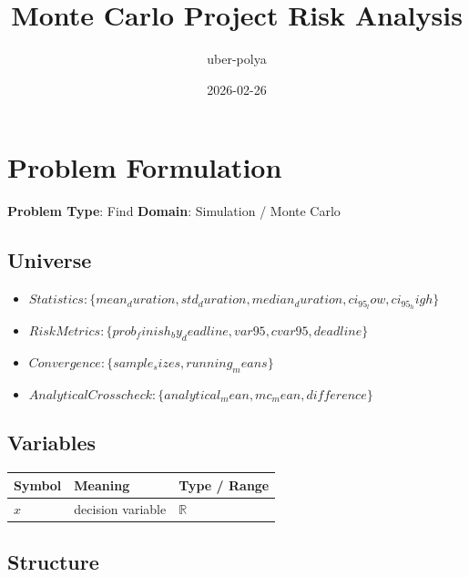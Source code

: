 \documentclass[11pt, a4paper]{article}
\title{Monte Carlo Project Risk Analysis}
\author{uber-polya}
\date{2026-02-26}
\begin{document}
\maketitle
\tableofcontents
\newpage

\section{Problem Formulation}

\begin{polyamodel}

\textbf{Problem Type}: Find \hfill
\textbf{Domain}: Simulation / Monte Carlo


\end{polyamodel}

\subsection{Universe}

\begin{itemize}
  \item $Statistics: \{mean_duration, std_duration, median_duration, ci_95_low, ci_95_high\}$
  \item $Risk Metrics: \{prob_finish_by_deadline, var95, cvar95, deadline\}$
  \item $Convergence: \{sample_sizes, running_means\}$
  \item $Analytical Crosscheck: \{analytical_mean, mc_mean, difference\}$
\end{itemize}

\subsection{Variables}

\begin{longtable}{lll}
\toprule
\textbf{Symbol} & \textbf{Meaning} & \textbf{Type / Range} \\
\midrule
\endhead
$x$ & decision variable & $\mathbb{{R}}$ \\
\bottomrule
\end{longtable}

\subsection{Structure}
\end{document}
